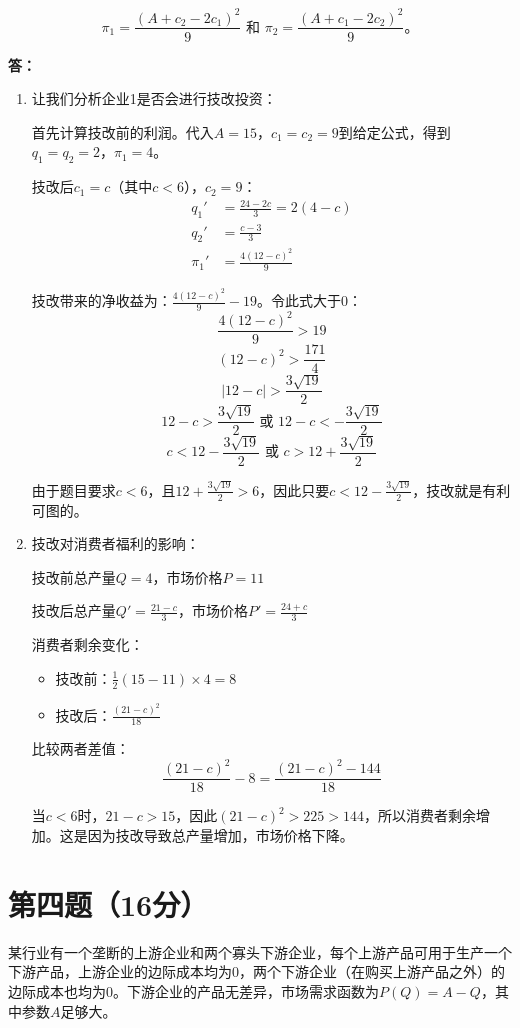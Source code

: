 \documentclass[12pt]{article}
\begin{document}
\[
\pi_1=\frac{(A+c_2-2c_1)^2}{9}\text{ 和 }\pi_2=\frac{(A+c_1-2c_2)^2}{9}。
\]

\noindent\textbf{答：}
\begin{enumerate}
\item 让我们分析企业1是否会进行技改投资：

首先计算技改前的利润。代入$A=15$，$c_1=c_2=9$到给定公式，得到$q_1=q_2=2$，$\pi_1=4$。

技改后$c_1=c$（其中$c<6$），$c_2=9$：
\begin{align*}
q_1' &= \frac{24-2c}{3} = 2(4-c)\\
q_2' &= \frac{c-3}{3}\\
\pi_1' &= \frac{4(12-c)^2}{9}
\end{align*}

技改带来的净收益为：$\frac{4(12-c)^2}{9}-19$。令此式大于0：
\[\frac{4(12-c)^2}{9}>19\]
\[(12-c)^2>\frac{171}{4}\]
\[|12-c|>\frac{3\sqrt{19}}{2}\]
\[12-c>\frac{3\sqrt{19}}{2} \text{ 或 } 12-c<-\frac{3\sqrt{19}}{2}\]
\[c<12-\frac{3\sqrt{19}}{2} \text{ 或 } c>12+\frac{3\sqrt{19}}{2}\]

由于题目要求$c<6$，且$12+\frac{3\sqrt{19}}{2}>6$，因此只要$c<12-\frac{3\sqrt{19}}{2}$，技改就是有利可图的。

\item 技改对消费者福利的影响：

技改前总产量$Q=4$，市场价格$P=11$

技改后总产量$Q'=\frac{21-c}{3}$，市场价格$P'=\frac{24+c}{3}$

消费者剩余变化：
\begin{itemize}
\item 技改前：$\frac{1}{2}(15-11)\times4=8$
\item 技改后：$\frac{(21-c)^2}{18}$
\end{itemize}

比较两者差值：
\[\frac{(21-c)^2}{18}-8=\frac{(21-c)^2-144}{18}\]

当$c<6$时，$21-c>15$，因此$(21-c)^2>225>144$，所以消费者剩余增加。这是因为技改导致总产量增加，市场价格下降。
\end{enumerate}

\section*{第四题（16分）}
某行业有一个垄断的上游企业和两个寡头下游企业，每个上游产品可用于生产一个下游产品，上游企业的边际成本均为0，两个下游企业（在购买上游产品之外）的边际成本也均为0。下游企业的产品无差异，市场需求函数为$P(Q)=A-Q$，其中参数$A$足够大。
\end{document}
